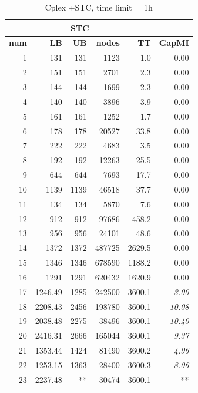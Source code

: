 \documentclass[11pt]{article}
\theoremstyle{plain}%
\theoremstyle{definition} \newtheorem{lem}{Lemma}[section]
\theoremstyle{definition} \newtheorem{claim}{Claim}[lem]
\theoremstyle{definition} \newtheorem{theorem}{Theorem}[section]
\theoremstyle{definition} \newtheorem{exo}{Exercice n$^\circ$}
\theoremstyle{definition} \newtheorem{quest}{}[exo]
\theoremstyle{definition} \newtheorem{sousquest}{}[quest]
\theoremstyle{remark}
\theoremstyle{definition}
\begin{document}
\begin{table}[H]
  \centering
  \small
  \caption{ Cplex +STC, time limit = 1h}
    \begin{tabular}{|r|rrrrr|}
    \toprule
    \multicolumn{5}{c}{ STC}                       &  \\
    \midrule
    \textbf{num} &  \textbf{LB} & \textbf{UB}  & \textbf{nodes} & \textbf{TT} & \textbf{GapMI} \\
    \midrule
    1     & 131   & 131   & 1123  & 1.0   & 0.00 \\
    2    & 151   & 151   & 2701  & 2.3   & 0.00 \\
    3     &144   & 144   &  1699  & 2.3   & 0.00 \\
    4     & 140   & 140   & 3896  & 3.9   & 0.00 \\
    5      & 161   & 161   &  1252  & 1.7   & 0.00 \\
    6     &178   & 178   & 20527 & 33.8  & 0.00 \\
    7     &  222   & 222   &  4683  & 3.5   & 0.00 \\
    8     & 192   & 192   &12263 & 25.5  & 0.00 \\
    9     &644   & 644   &7693  & 17.7  & 0.00 \\
    10    &  1139  & 1139  &  46518 & 37.7  & 0.00 \\
    11    &  134   & 134   & 5870  & 7.6   & 0.00 \\
    12    &  912   & 912   & 97686 & 458.2 & 0.00 \\
    13    &  956   & 956   & 24101 & 48.6  & 0.00 \\
    14    & 1372  & 1372  &  487725 & 2629.5 & 0.00 \\
    15    &  1346  & 1346  & 678590 & 1188.2 & 0.00 \\
    16    & 1291  & 1291  &  620432 & 1620.9 & 0.00 \\
    17    &1246.49 & 1285  & 242500 & 3600.1 & {\it 3.00} \\
    18    &  2208.43 & 2456  &198780 & 3600.1 & {\it 10.08} \\
    19    &2038.48 & 2275  & 38496 & 3600.1 &  {\it 10.40} \\
    20    &  2416.31 & 2666  &165044 & 3600.1 & {\it 9.37} \\
    21    & 1353.44 & 1424  &  81490 & 3600.2 & {\it 4.96} \\
    22    &1253.15 & 1363  & 28400 & 3600.3 & {\it 8.06} \\
    23    & 2237.48 & **   & 30474 & 3600.1 & ** \\

\end{tabular}
\end{table}
\end{document}
